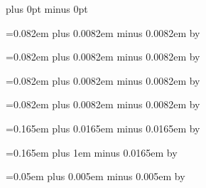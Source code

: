 \def\endofsyllable{%
\penalty -500%
}


\def\endofelement#1{%
\ifcase#1%
\hskip\interelementspace%
\or%
\hskip\largerspace%
\or%
\hskip\glyphspace%
\fi%
\penalty -100%
}


\def\endofglyph#1{%
\ifcase#1%
\hskip\interglyphspace %
\or%
\hskip\zerowidthspace %
\or%
\hskip\alterationspace %
\or%
\hskip\punctuminclinatumshift %
\or%
\hskip\bispace %
\or%
\hskip\trispace %
\fi%
\penalty 10001%
}


\newskip\zerowidthspace
\zerowidthspace=0pt plus 0pt minus 0pt

\newskip\interglyphspace
\interglyphspace=0.082em plus 0.0082em minus 0.0082em
\multiply\interglyphspace by \factor

\newskip\alterationspace
\alterationspace=0.082em plus 0.0082em minus 0.0082em
\multiply\alterationspace by \factor

\newskip\interelementspace
\interelementspace=0.082em plus 0.0082em minus 0.0082em
\multiply\interelementspace by \factor

\newskip\largerspace
\largerspace=0.082em plus 0.0082em minus 0.0082em
\multiply\largerspace by \factor

\newskip\glyphspace
\glyphspace=0.165em plus 0.0165em minus 0.0165em
\multiply\glyphspace by \factor

\newskip\spacebeforecusto
\spacebeforecusto=0.165em plus 1em minus 0.0165em
\multiply\spacebeforecusto by \factor

\newskip\spacebeforesigns
\spacebeforesigns=0.05em plus 0.005em minus 0.005em
\multiply\spacebeforesigns by \factor

